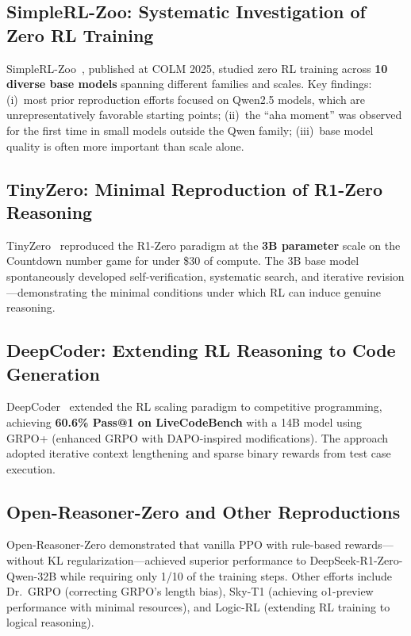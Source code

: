 \documentclass[12pt,a4paper]{report}
\begin{document}
\subsection{SimpleRL-Zoo: Systematic Investigation of Zero RL Training}

SimpleRL-Zoo~\cite{zeng2025simplerl}, published at COLM 2025, studied zero RL training across \textbf{10 diverse base models} spanning different families and scales. Key findings: (i)~most prior reproduction efforts focused on Qwen2.5 models, which are unrepresentatively favorable starting points; (ii)~the ``aha moment'' was observed for the first time in small models outside the Qwen family; (iii)~base model quality is often more important than scale alone.

\subsection{TinyZero: Minimal Reproduction of R1-Zero Reasoning}

TinyZero~\cite{wen2025tinyzero} reproduced the R1-Zero paradigm at the \textbf{3B parameter} scale on the Countdown number game for under \$30 of compute. The 3B base model spontaneously developed self-verification, systematic search, and iterative revision---demonstrating the minimal conditions under which RL can induce genuine reasoning.

\subsection{DeepCoder: Extending RL Reasoning to Code Generation}

DeepCoder~\cite{xu2025deepcoder} extended the RL scaling paradigm to competitive programming, achieving \textbf{60.6\% Pass@1 on LiveCodeBench} with a 14B model using GRPO+ (enhanced GRPO with DAPO-inspired modifications). The approach adopted iterative context lengthening and sparse binary rewards from test case execution.

\subsection{Open-Reasoner-Zero and Other Reproductions}

Open-Reasoner-Zero demonstrated that vanilla PPO with rule-based rewards---without KL regularization---achieved superior performance to DeepSeek-R1-Zero-Qwen-32B while requiring only 1/10 of the training steps. Other efforts include Dr.\ GRPO (correcting GRPO's length bias), Sky-T1 (achieving o1-preview performance with minimal resources), and Logic-RL (extending RL training to logical reasoning).
\end{document}
